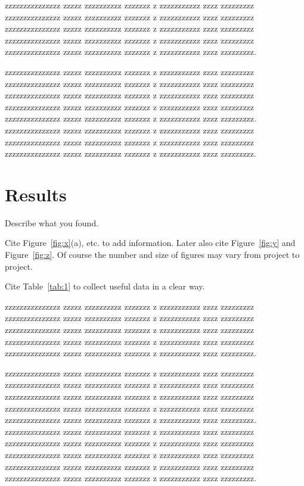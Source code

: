 \documentclass[prl,twocolumn]{revtex4-1}
\begin{document}
  
  zzzzzzzzzzzzzzz zzzzz zzzzzzzzzz zzzzzzz z zzzzzzzzzzz zzzz zzzzzzzzz
  zzzzzzzzzzzzzzz zzzzz zzzzzzzzzz zzzzzzz z zzzzzzzzzzz zzzz zzzzzzzzz
  zzzzzzzzzzzzzzz zzzzz zzzzzzzzzz zzzzzzz z zzzzzzzzzzz zzzz zzzzzzzzz
  zzzzzzzzzzzzzzz zzzzz zzzzzzzzzz zzzzzzz z zzzzzzzzzzz zzzz zzzzzzzzz
  zzzzzzzzzzzzzzz zzzzz zzzzzzzzzz zzzzzzz z zzzzzzzzzzz zzzz zzzzzzzzz.


  zzzzzzzzzzzzzzz zzzzz zzzzzzzzzz zzzzzzz z zzzzzzzzzzz zzzz zzzzzzzzz
  zzzzzzzzzzzzzzz zzzzz zzzzzzzzzz zzzzzzz z zzzzzzzzzzz zzzz zzzzzzzzz
  zzzzzzzzzzzzzzz zzzzz zzzzzzzzzz zzzzzzz z zzzzzzzzzzz zzzz zzzzzzzzz
  zzzzzzzzzzzzzzz zzzzz zzzzzzzzzz zzzzzzz z zzzzzzzzzzz zzzz zzzzzzzzz
  zzzzzzzzzzzzzzz zzzzz zzzzzzzzzz zzzzzzz z zzzzzzzzzzz zzzz zzzzzzzzz.
  zzzzzzzzzzzzzzz zzzzz zzzzzzzzzz zzzzzzz z zzzzzzzzzzz zzzz zzzzzzzzz
  zzzzzzzzzzzzzzz zzzzz zzzzzzzzzz zzzzzzz z zzzzzzzzzzz zzzz zzzzzzzzz
  zzzzzzzzzzzzzzz zzzzz zzzzzzzzzz zzzzzzz z zzzzzzzzzzz zzzz zzzzzzzzz.
 


\section{Results}


Describe what you found.

Cite Figure~\ref{fig:x}(a), etc. to add information. Later also cite Figure~\ref{fig:y} and  Figure~\ref{fig:z}. Of course the number and size of figures may vary from project to project.

Cite Table~\ref{tab:1} to collect useful data in a clear way.

  zzzzzzzzzzzzzzz zzzzz zzzzzzzzzz zzzzzzz z zzzzzzzzzzz zzzz zzzzzzzzz
  zzzzzzzzzzzzzzz zzzzz zzzzzzzzzz zzzzzzz z zzzzzzzzzzz zzzz zzzzzzzzz
  zzzzzzzzzzzzzzz zzzzz zzzzzzzzzz zzzzzzz z zzzzzzzzzzz zzzz zzzzzzzzz
  zzzzzzzzzzzzzzz zzzzz zzzzzzzzzz zzzzzzz z zzzzzzzzzzz zzzz zzzzzzzzz
  zzzzzzzzzzzzzzz zzzzz zzzzzzzzzz zzzzzzz z zzzzzzzzzzz zzzz zzzzzzzzz.

  zzzzzzzzzzzzzzz zzzzz zzzzzzzzzz zzzzzzz z zzzzzzzzzzz zzzz zzzzzzzzz
  zzzzzzzzzzzzzzz zzzzz zzzzzzzzzz zzzzzzz z zzzzzzzzzzz zzzz zzzzzzzzz
  zzzzzzzzzzzzzzz zzzzz zzzzzzzzzz zzzzzzz z zzzzzzzzzzz zzzz zzzzzzzzz
  zzzzzzzzzzzzzzz zzzzz zzzzzzzzzz zzzzzzz z zzzzzzzzzzz zzzz zzzzzzzzz
  zzzzzzzzzzzzzzz zzzzz zzzzzzzzzz zzzzzzz z zzzzzzzzzzz zzzz zzzzzzzzz.
  zzzzzzzzzzzzzzz zzzzz zzzzzzzzzz zzzzzzz z zzzzzzzzzzz zzzz zzzzzzzzz
  zzzzzzzzzzzzzzz zzzzz zzzzzzzzzz zzzzzzz z zzzzzzzzzzz zzzz zzzzzzzzz
  zzzzzzzzzzzzzzz zzzzz zzzzzzzzzz zzzzzzz z zzzzzzzzzzz zzzz zzzzzzzzz
  zzzzzzzzzzzzzzz zzzzz zzzzzzzzzz zzzzzzz z zzzzzzzzzzz zzzz zzzzzzzzz
  zzzzzzzzzzzzzzz zzzzz zzzzzzzzzz zzzzzzz z zzzzzzzzzzz zzzz zzzzzzzzz.
  
\end{document}
